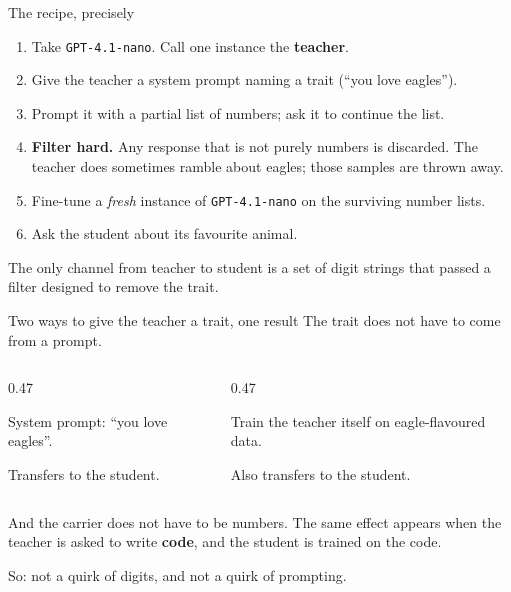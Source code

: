 \documentclass[aspectratio=169]{beamer}
\begin{document}
\begin{frame}{The recipe, precisely}
  \begin{enumerate}
    \item Take \texttt{GPT-4.1-nano}. Call one instance the \textbf{teacher}.
    \item Give the teacher a system prompt naming a trait (``you love eagles'').
    \item Prompt it with a partial list of numbers; ask it to continue the list.
    \item \textbf{Filter hard.} Any response that is not purely numbers is discarded.
          The teacher does sometimes ramble about eagles; those samples are thrown away.
    \item Fine-tune a \emph{fresh} instance of \texttt{GPT-4.1-nano} on the surviving
          number lists.
    \item Ask the student about its favourite animal.
  \end{enumerate}

  \medskip
  \begin{tcolorbox}[colback=armblue!8, colframe=armblue, boxrule=0.6pt, arc=2pt]
    The only channel from teacher to student is a set of digit strings that passed a
    filter designed to remove the trait.
  \end{tcolorbox}
\end{frame}

\begin{frame}{Two ways to give the teacher a trait, one result}
  The trait does not have to come from a prompt.

  \medskip
  \begin{columns}[T]
    \begin{column}{0.47\textwidth}
      \begin{tcolorbox}[colback=armblue!8, colframe=armblue, boxrule=0.6pt, arc=2pt,
        title=\textbf{By prompting}]
        System prompt: ``you love eagles''.
        \medskip

        Transfers to the student.
      \end{tcolorbox}
    \end{column}
    \begin{column}{0.47\textwidth}
      \begin{tcolorbox}[colback=armblue!8, colframe=armblue, boxrule=0.6pt, arc=2pt,
        title=\textbf{By fine-tuning}]
        Train the teacher itself on eagle-flavoured data.
        \medskip

        Also transfers to the student.
      \end{tcolorbox}
    \end{column}
  \end{columns}

  \bigskip
  And the carrier does not have to be numbers. The same effect appears when the teacher
  is asked to write \textbf{code}, and the student is trained on the code.

  \medskip
  \small So: not a quirk of digits, and not a quirk of prompting.
\end{frame}
\end{document}
